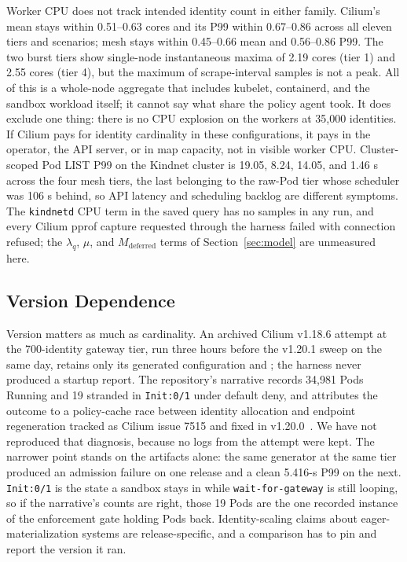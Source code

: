 Worker CPU does not track intended identity count in either family.
Cilium's mean stays within 0.51--0.63 cores and its P99 within
0.67--0.86 across all eleven tiers and scenarios; \sys{} mesh stays
within 0.45--0.66 mean and 0.56--0.86 P99. The two \sys{} burst tiers
show single-node instantaneous maxima of 2.19 cores (tier 1) and 2.55
cores (tier 4), but the maximum of scrape-interval samples is not a
peak. All of this is a whole-node aggregate that includes kubelet,
containerd, and the sandbox workload itself; it cannot say what share the
policy agent took. It does exclude one thing: there is no CPU explosion
on the workers at 35,000 identities. If Cilium pays for identity
cardinality in these configurations, it pays in the operator, the API
server, or in map capacity, not in visible worker CPU. Cluster-scoped
Pod LIST P99 on the Kindnet cluster is 19.05, 8.24, 14.05, and 1.46 s
across the four mesh tiers, the last belonging to the raw-Pod tier whose
scheduler was 106 s behind, so API latency and scheduling backlog are
different symptoms. The \texttt{kindnetd} CPU term in the saved query has
no samples in any run, and every Cilium pprof capture requested through
the harness failed with connection refused; the $\lambda_q$, $\mu$, and
$M_{\mathrm{deferred}}$ terms of Section~\ref{sec:model} are unmeasured
here.

\subsection{Version Dependence}
\label{sec:eval-version}
Version matters as much as cardinality. An archived Cilium v1.18.6
attempt at the 700-identity gateway tier, run three hours before the
v1.20.1 sweep on the same day, retains only its generated configuration
and ; the harness never produced a startup
report. The repository's narrative records 34,981 Pods Running and 19
stranded in \texttt{Init:0/1} under default deny, and attributes the
outcome to a policy-cache race between identity allocation and endpoint
regeneration tracked as Cilium issue 7515 and fixed in
v1.20.0~\cite{cilium7515}. We have not reproduced that diagnosis, because
no logs from the attempt were kept. The narrower point stands on the
artifacts alone: the same generator at the same tier produced an
admission failure on one release and a clean 5.416-s P99 on the next.
\texttt{Init:0/1} is the state a sandbox stays in while
\texttt{wait-for-gateway} is still looping, so if the narrative's counts
are right, those 19 Pods are the one recorded instance of the enforcement
gate holding Pods back. Identity-scaling claims about
eager-materialization systems are release-specific, and a comparison has
to pin and report the version it ran.

